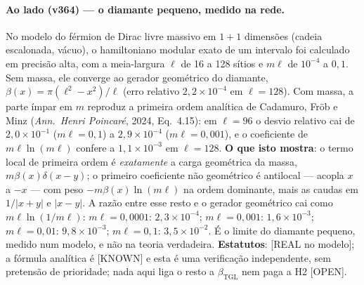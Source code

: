 \documentclass[11pt]{article}
\newcommand{\bTGL}{\beta_{\mathrm{TGL}}}\newcommand{\Msun}{M_{\odot}}\newcommand{\TGL}{\mathrm{TGL}}
\theoremstyle{definition}\newtheorem{deriv}{Derivação}
\begin{document}
\paragraph*{Ao lado (v364) --- o diamante pequeno, medido na rede.} No modelo do férmion de Dirac livre massivo em $1+1$ dimensões (cadeia escalonada, vácuo), o hamiltoniano modular exato de um intervalo foi calculado em precisão alta, com a meia-largura $\ell$ de 16 a 128 sítios e $m\ell$ de $10^{-4}$ a $0{,}1$. Sem massa, ele converge ao gerador geométrico do diamante, $\beta(x)=\pi(\ell^2-x^2)/\ell$ (erro relativo $2,2\times10^{-4}$ em $\ell=128$). Com massa, a parte ímpar em $m$ reproduz a primeira ordem analítica de Cadamuro, Fröb e Minz (\emph{Ann.\ Henri Poincaré}, 2024, Eq.~4.15): em $\ell=96$ o desvio relativo cai de $2,0\times10^{-1}$ ($m\ell=0{,}1$) a $2,9\times10^{-4}$ ($m\ell=0{,}001$), e o coeficiente de $m\ell\ln(m\ell)$ confere a $1,1\times10^{-3}$ em $\ell=128$. \textbf{O que isto mostra}: o termo local de primeira ordem é \emph{exatamente} a carga geométrica da massa, $m\beta(x)\delta(x-y)$; o primeiro coeficiente não geométrico é antilocal --- acopla $x$ a $-x$ --- com peso $-m\beta(x)\ln(m\ell)$ na ordem dominante, mais as caudas em $1/|x+y|$ e $|x-y|$. A razão entre esse resto e o gerador geométrico cai como $m\ell\ln(1/m\ell)$: $m\ell=0{,}0001$: $2,3\times10^{-4}$; $m\ell=0{,}001$: $1,6\times10^{-3}$; $m\ell=0{,}01$: $9,8\times10^{-3}$; $m\ell=0{,}1$: $3,5\times10^{-2}$. É o limite do diamante pequeno, medido num modelo, e não na teoria verdadeira. \textbf{Estatutos}: [REAL no modelo]; a fórmula analítica é [KNOWN] e esta é uma verificação independente, sem pretensão de prioridade; nada aqui liga o resto a $\bTGL$ nem paga a H2 [OPEN].
\end{document}
